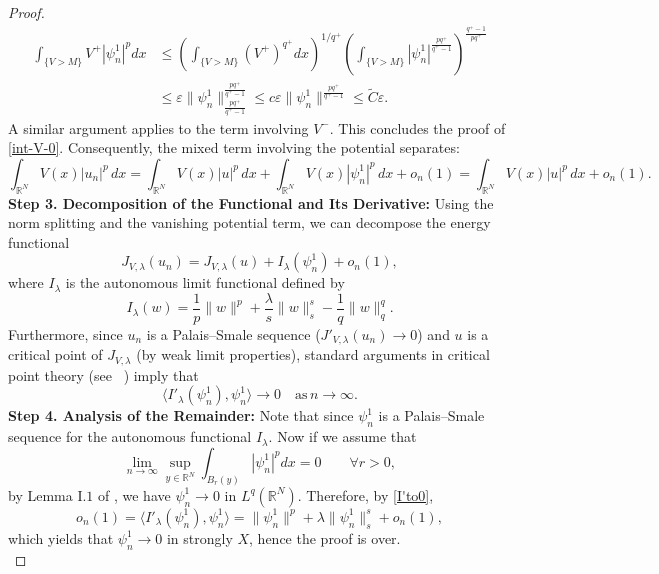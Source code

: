 \documentclass[11pt,reqno]{amsart}
\theoremstyle{definition}
\numberwithin{equation}{section}
\numberwithin{theorem}{section}
\numberwithin{equation}{section}
\numberwithin{theorem}{section}
\newcommand{\rn}{\mathbb{R}^N}
\newcommand{\R}{\mathbb{R}}
\begin{document}
\begin{proof}
\begin{equation}
\begin{aligned}
\int_{\{V>M\}} V^+|\psi^1_n|^p dx&\le \left(\int_{\{V>M\}} (V^+)^{q^+}dx\right)^{1/q^+}\left(\int_{\{V>M\}}|\psi^1_n|^{\frac{pq^+}{q^+-1}}\right)^{\frac{q^+-1}{pq^+}}\\
&\le \varepsilon\|\psi^1_n\|^{\frac{pq^+}{q^+-1}}_{\frac{pq^+}{q^+-1}}\le c\varepsilon \|\psi^1_n\|^{\frac{pq^+}{q^+-1}}\le \tilde{C}\varepsilon.   
\end{aligned}
\end{equation}
A similar argument applies to the term involving $V^-$. This concludes the proof of \eqref{int-V-0}.
Consequently, the mixed term involving the potential separates:$$\int_{\mathbb{R}^N} V(x)|u_n|^p \, dx = \int_{\mathbb{R}^N} V(x)|u|^p \, dx + \int_{\mathbb{R}^N} V(x)|\psi_n^1|^p \, dx + o_n(1) = \int_{\mathbb{R}^N} V(x)|u|^p \, dx + o_n(1).$$
{\bf Step 3. Decomposition of the Functional and Its Derivative:}
Using the norm splitting and the vanishing potential term, we can decompose the energy functional
$$J_{V,\lambda}(u_n) = J_{V,\lambda}(u) + I_\lambda(\psi_n^1) + o_n(1),$$
where $I_\lambda$ is the autonomous limit functional defined by
$$I_\lambda(w) = \frac{1}{p} \|w\|^p + \frac{\lambda}{s} \|w\|_s^s - \frac{1}{q} \|w\|_q^q.$$
Furthermore, since $u_n$ is a Palais--Smale sequence ($J'_{V,\lambda}(u_n) \to 0$) and $u$ is a critical point of $J_{V,\lambda}$ (by weak limit properties), standard arguments in critical point theory (see ~\cite[p:8-9]{dhara2025normalised}) imply that %
\begin{equation}\label{I'to0}
\langle I'_\lambda(\psi_n^1),\psi^1_n\rangle \to 0 \quad \text{as}\,n\to\infty.%
\end{equation}
{\bf Step 4. Analysis of the Remainder:} Note that since $\psi_n^1$ is a Palais--Smale sequence for the autonomous functional $I_\lambda$.
Now if we assume that
$$\lim_{n\to\infty} \sup_{y\in\R^N}\int_{B_r(y)}|\psi^1_n|^pdx=0\qquad\forall r>0,$$
by Lemma I.$1$ of \cite{lions1984concentration2}, we have $\psi^1_n\to 0$ in $L^q(\R^N)$. %
Therefore, by \eqref{I'to0},
$$o_n(1)=\langle I'_\lambda(\psi^1_n),\psi^1_n\rangle=\|\psi^1_n\|^p+\lambda\|\psi^1_n\|^s_s+o_n(1),$$
which yields that $\psi^1_n\to 0$ in strongly $X$, hence the proof is over.\\


\end{proof}
\end{document}
